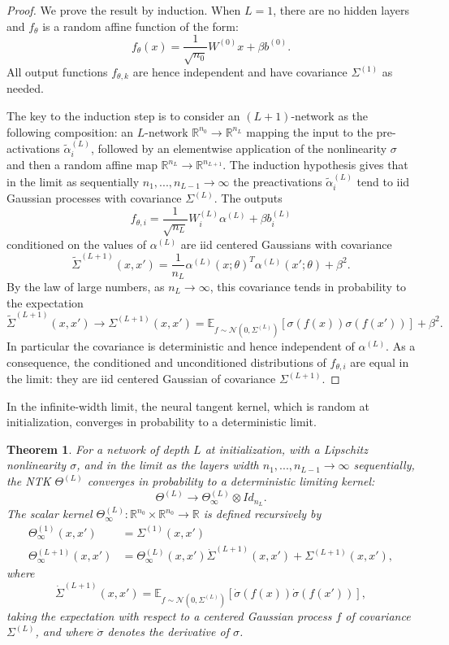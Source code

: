 \documentclass{article}
\newtheorem{thm}{Theorem}
\begin{document}
\begin{proof}We prove the result by induction. When $L=1$, there are no hidden layers and $f_\theta$ is a random affine function of the form:
$$
 f_\theta(x) = \frac{1}{\sqrt{n_0}} W^{(0)} x + \beta b^{(0)}.
$$
All output functions $f_{\theta, k}$ are hence independent and have covariance $\Sigma^{(1)}$ as needed.

The key to the induction step is to consider an $(L+1)$-network as the following composition: an $L$-network $\mathbb{R}^{n_0} \to \mathbb{R}^{n_L}$ mapping the input to the pre-activations $\tilde{\alpha}^{(L)}_i$, followed by an elementwise application of the nonlinearity $\sigma$ and then a random affine map $\mathbb{R}^{n_L} \to \mathbb{R}^{n_{L+1}}$. The induction hypothesis gives that in the limit as sequentially $n_1, ..., n_{L-1} \to \infty$ the preactivations $\tilde{\alpha}^{(L)}_i$ tend to iid Gaussian processes with covariance $\Sigma^{(L)}$. The outputs
$$
f_{\theta, i} = \frac{1}{\sqrt{n_L}} W_i^{(L)} \alpha^{(L)} + \beta b_i^{(L)}
$$
conditioned on the values of $\alpha^{(L)}$ are iid centered Gaussians with covariance
$$
 \tilde{\Sigma}^{(L+1)}(x, x') = \frac{1}{n_L} \alpha^{(L)}(x;\theta)^T \alpha^{(L)}(x';\theta) + \beta^2.
$$
By the law of large numbers, as $n_L \to \infty$, this covariance tends in probability to the expectation
$$\tilde{\Sigma}^{(L+1)}(x, x') \to \Sigma^{(L+1)}(x, x') = \mathbb{E}_{f \sim \mathcal{N}(0, \Sigma^{(L)})}[\sigma(f(x)) \sigma(f(x'))] + \beta^2.$$
In particular the covariance is deterministic and hence independent of $\alpha^{(L)}$. As a consequence, the conditioned and unconditioned distributions of $f_{\theta, i}$ are equal in the limit: they are iid centered Gaussian of covariance $\Sigma^{(L+1)}$.
\end{proof}

In the infinite-width limit, the neural tangent kernel, which is random at initialization, converges in probability to a deterministic limit.
\begin{thm}\label{thm:convergence_kernel_initialization}
For a network of depth $L$ at initialization, with a Lipschitz nonlinearity $\sigma$, and in the limit as the layers width $n_1, ..., n_{L-1} \to \infty$ sequentially, the NTK $\Theta^{(L)}$ converges in probability to a deterministic limiting kernel: $$\Theta^{(L)} \to \Theta^{(L)}_\infty \otimes Id_{n_L}.$$
The scalar kernel $\Theta^{(L)}_\infty : \mathbb{R}^{n_0} \times \mathbb{R}^{n_0} \to \mathbb{R}$ is defined recursively by
\begin{align*}
    \Theta^{(1)}_\infty(x, x') &= \Sigma^{(1)}(x, x') \\
    \Theta^{(L+1)}_\infty(x, x') &=  \Theta^{(L)}_\infty(x, x') \dot{\Sigma}^{(L+1)}(x, x')  + \Sigma^{(L+1)}(x, x'),
\end{align*}
where
\[
	\dot{\Sigma}^{(L+1)}\left(x,x'\right)=
	\mathbb{E}_{f\sim\mathcal{N}\left(0,\Sigma^{\left(L\right)}\right)}\left[\dot{\sigma}\left(f\left(x\right)\right)\dot{\sigma}\left(f\left(x'\right)\right)\right],
\]
taking the expectation with respect to a centered Gaussian process $f$ of covariance $\Sigma^{(L)}$, and where $\dot{\sigma}$ denotes the derivative of $\sigma$.
\end{thm}
\end{document}
